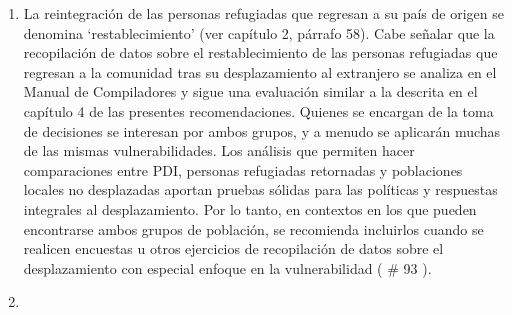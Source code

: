 \documentclass[
]{book}
\begin{document}
\begin{enumerate}
\item
  La reintegración de las personas refugiadas que regresan a su país de origen se denomina `restablecimiento' (ver capítulo 2, párrafo 58). Cabe señalar que la recopilación de datos sobre el restablecimiento de las personas refugiadas que regresan a la comunidad tras su desplazamiento al extranjero se analiza en el Manual de Compiladores y sigue una evaluación similar a la descrita en el capítulo 4 de las presentes recomendaciones. Quienes se encargan de la toma de decisiones se interesan por ambos grupos, y a menudo se aplicarán muchas de las mismas vulnerabilidades. Los análisis que permiten hacer comparaciones entre PDI, personas refugiadas retornadas y poblaciones locales no desplazadas aportan pruebas sólidas para las políticas y respuestas integrales al desplazamiento. Por lo tanto, en contextos en los que pueden encontrarse ambos grupos de población, se recomienda incluirlos cuando se realicen encuestas u otros ejercicios de recopilación de datos sobre el desplazamiento con especial enfoque en la vulnerabilidad (
  \# 93
  ).
\item ~
  \hypertarget{otras-personas-desplazadas-que-regresan-del-extranjero-despuuxe9s-de-un-periodo-de-12-meses}{%
}
\end{enumerate}
\end{document}
